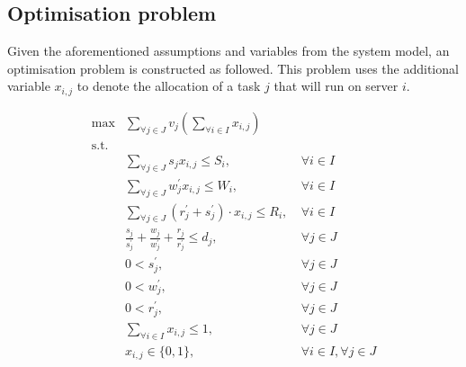 \subsection{Optimisation problem}
\label{subsec:optimisation-problem}
Given the aforementioned assumptions and variables from the system model, an optimisation problem is constructed as
followed. This problem uses the additional variable $x_{i,j}$ to denote the allocation of a task $j$ that will run on
server $i$.

\begin{align}
    \max & \sum_{\forall j \in J} v_j \left(\sum_{\forall i \in I} x_{i,j}\right) \label{eq:objective} \\
    \mbox{s.t.} \nonumber \\
    & \sum_{\forall j \in J} s_j x_{i,j} \leq S_i, &~ \forall{i \in I} \label{eq:server-storage-constraint} \\
    & \sum_{\forall j \in J} w^{'}_j x_{i,j} \leq W_i, &~ \forall{i \in I} \label{eq:server-computation-constraint} \\
    & \sum_{\forall j \in J} (r^{'}_j + s^{'}_j) \cdot x_{i,j} \leq R_i, &~ \forall{i \in I} \label{eq:server-bandwidth-constraint} \\
    & \frac{s_j}{s^{'}_j} + \frac{w_j}{w^{'}_j} + \frac{r_j}{r^{'}_j} \leq d_j, &~ \forall{j \in J} \label{eq:task-deadline} \\
    & 0 < s^{'}_j, &~ \forall{j \in J} \label{eq:loading-speeds} \\
    & 0 < w^{'}_j, &~ \forall{j \in J} \label{eq:compute-speeds} \\
    & 0 < r^{'}_j, &~ \forall{j \in J} \label{eq:sending-speeds} \\
    & \sum_{\forall i \in I} x_{i,j} \leq 1, &~ \forall{j \in J} \label{eq:server-task-allocation} \\
    & x_{i,j} \in \{0, 1\}, &~ \forall{i \in I},\forall{j \in J} \label{eq:task-allocation}
\end{align}

